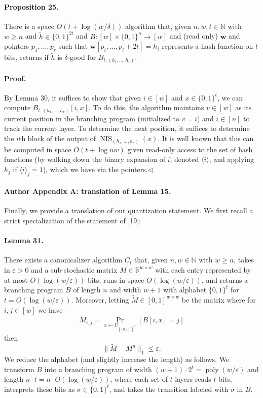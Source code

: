 \paragraph{Proposition 25.} There is a space $O(t+\log(w/\delta))$ algorithm that, given $n,w,t\in\mathbb N$ with $w\geq n$ and $\widetilde h\in\{0,1\}^{2t}$ and $B:[w]\times\{0,1\}^n\to[w]$ and (read only) $\mathbf w$ and pointers $p_1,\ldots,p_r$ such that $\mathbf w[p_i,\ldots,p_i+2t]=h_i$ represents a hash function on $t$ bits, returns if $\widetilde h$ is $\delta$-good for $B_{t,(h_1,\ldots,h_r)}$.
\paragraph{Proof.} By Lemma 30, it suffices to show that given $i\in[w]$ and $x\in\{0,1\}^t$, we can compute $B_{t,(h_1,\ldots,h_r)}[i,x]$. To do this, the algorithm maintains $v\in[w]$ as its current position in the branching program (initialized to $v=i$) and $i\in[n]$ to track the current layer. To determine the next position, it suffices to determine the $i$th block of the output of $\operatorname{NIS}_{(h_1,\ldots,h_r)}(x)$. It is well known that this can be computed in space $O(t+\log nw)$ given read-only access to the set of hash functions (by walking down the binary expansion of $i$, denoted $\langle i\rangle$, and applying $h_j$ if $\langle i\rangle_j=1$), which we have via the pointers.\hfill$\triangleleft$

\paragraph{Author Appendix A: translation of Lemma 15.} Finally, we provide a translation of our quantization statement. We first recall a strict specialization of the statement of [19]:
\paragraph{Lemma 31.} There exists a canonicalizer algorithm $C_t$ that, given $n,w\in\mathbb N$ with $w\geq n$, takes in $\varepsilon>0$ and a sub-stochastic matrix $M\in\mathbb R^{w\times w}$ with each entry represented by at most $O(\log(w/\varepsilon))$ bits, runs in space $O(\log(w/\varepsilon))$, and returns a branching program $B$ of length $n$ and width $w+1$ with alphabet $\{0,1\}^t$ for $t=O(\log(w/\varepsilon))$. Moreover, letting $\widetilde M\in[0,1]^{w\times w}$ be the matrix where for $i,j\in[w]$ we have
\[\widetilde M_{i,j}=\Pr_{x\leftarrow U_{(\{0,1\}^t)^n}}[B[i,x]=j]\]
then
\[\|\widetilde M-M^n\|_1\leq\varepsilon.\]
We reduce the alphabet (and slightly increase the length) as follows. We transform $B$ into a branching program of width $(w+1)\cdot2^t=\operatorname{poly}(w/\varepsilon)$ and length $n\cdot t=n\cdot O(\log(w/\varepsilon))$, where each set of $t$ layers reads $t$ bits, interprets these bits as $\sigma\in\{0,1\}^t$, and takes the transition labeled with $\sigma$ in $B$.
